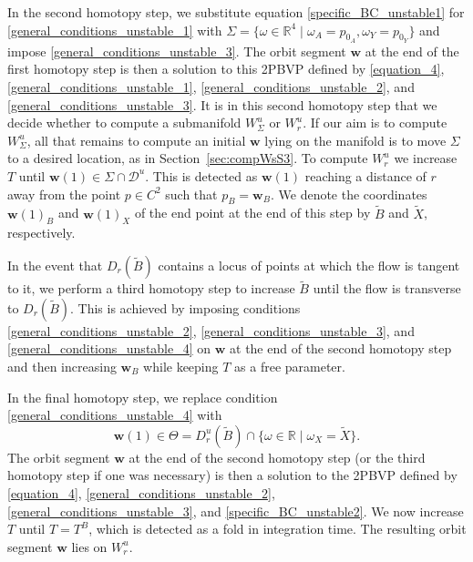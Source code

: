 \documentclass{ws-ijbc}
\begin{document}
In the second homotopy step, we substitute equation \eqref{specific_BC_unstable1} for \eqref{general_conditions_unstable_1} with $\Sigma=\{ \omega \in \mathbb{R}^4 \;|\; \omega_A=p_{0_A}, \omega_Y=p_{0_Y} \}$ and impose \eqref{general_conditions_unstable_3}.  The orbit segment $\mathbf{w}$ at the end of the first homotopy step is then a solution to this 2PBVP defined by \eqref{equation_4}, \eqref{general_conditions_unstable_1}, \eqref{general_conditions_unstable_2}, and \eqref{general_conditions_unstable_3}.  It is in this second homotopy step that we decide whether to compute a submanifold $W^u_\Sigma$ or $W^u_r$.  If our aim is to compute $W^u_\Sigma$, all that remains to compute an initial $\mathbf{w}$ lying on the manifold is to move $\Sigma$ to a desired location, as in Section~\ref{sec:compWsS3}.  To compute $W^u_r$ we increase $T$ until $\mathbf{w}(1) \in \Sigma \cap \mathscr{D}^u$.  This is detected as $\mathbf{w}(1)$ reaching a distance of $r$ away from the point $p \in C^2$ such that $p_B = \mathbf{w}_B$.  We denote the coordinates $\mathbf{w}(1)_B$ and $\mathbf{w}(1)_X$ of the end point at the end of this step by $\widetilde{B}$ and $\widetilde{X}$, respectively.  

In the event that $D_r(\widetilde{B})$ contains a locus of points at which the flow is tangent to it, we perform a third homotopy step to increase $\widetilde{B}$ until the flow is transverse to $D_r(\widetilde{B})$.  This is achieved by imposing conditions \eqref{general_conditions_unstable_2}, \eqref{general_conditions_unstable_3}, and \eqref{general_conditions_unstable_4} on $\mathbf{w}$ at the end of the second homotopy step and then increasing $\mathbf{w}_B$ while keeping $T$ as a free parameter.

In the final homotopy step, we replace condition \eqref{general_conditions_unstable_4} with 
%
\begin{equation}
		\mathbf{w}(1) \in \Theta = D^u_r(\widetilde{B}) \cap \{ \omega \in \mathbb{R} \; | \; \omega_X = \widetilde{X} \}.
		\label{specific_BC_unstable2}
\end{equation}
%
The orbit segment $\mathbf{w}$ at the end of the second homotopy step (or the third homotopy step if one was necessary) is then a solution to the 2PBVP defined by \eqref{equation_4}, \eqref{general_conditions_unstable_2}, \eqref{general_conditions_unstable_3}, and \eqref{specific_BC_unstable2}.    We now increase $T$ until $T=T^B$, which is detected as a fold in integration time.  The resulting orbit segment $\mathbf{w}$ lies on $W^u_r$.
\end{document}
